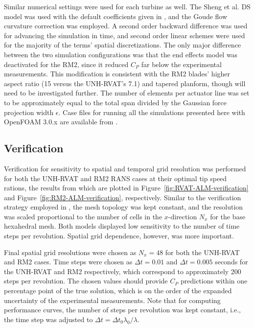 \documentclass[times]{weauth}
\begin{document}
Similar numerical settings were used for each turbine as well. The Sheng et al.
DS model was used with the default coefficients given in \cite{Sheng2008}, and
the Goude flow curvature correction was employed. A second order backward
difference was used for advancing the simulation in time, and second order
linear schemes were used for the majority of the terms' spatial discretizations.
The only major difference between the two simulation configurations was that the
end effects model was deactivated for the RM2, since it reduced $C_P$ far below
the experimental measurements. This modification is consistent with the RM2
blades' higher aspect ratio (15 versus the UNH-RVAT's 7.1) and tapered planform,
though will need to be investigated further. The number of elements per actuator
line was set to be approximately equal to the total span divided by the Gaussian
force projection width $\epsilon$. Case files for running all the simulations
presented here with OpenFOAM 3.0.x are available from
\cite{Bachant2016-UNH-RVAT-turbinesFoam-v1.0.0,
Bachant2016-RM2-turbinesFoam-v1.0.0,
Bachant2016-UNH-RVAT-turbinesFoam-v1.0.0-LES}.



\subsection{Verification}

Verification for sensitivity to spatial and temporal grid resolution was
performed for both the UNH-RVAT and RM2 RANS cases at their optimal tip speed
rations, the results from which are plotted in
Figure~\ref{fig:RVAT-ALM-verification} and
Figure~\ref{fig:RM2-ALM-verification}, respectively. Similar to the verification
strategy employed in \cite{Bachant2016-BR-CFD}, the mesh topology was kept
constant, and the resolution was scaled proportional to the number of cells in
the $x$-direction $N_x$ for the base hexahedral mesh. Both models displayed low
sensitivity to the number of time steps per revolution. Spatial grid dependence,
however, was more important.

Final spatial grid resolutions were chosen as $N_x=48$ for both the UNH-RVAT and
RM2 cases. Time steps were chosen as $\Delta t = 0.01$ and $\Delta t = 0.005$
seconds for the UNH-RVAT and RM2 respectively, which correspond to approximately
200 steps per revolution. The chosen values should provide $C_P$ predictions
within one percentage point of the true solution, which is on the order of the
expanded uncertainty of the experimental measurements. Note that for computing
performance curves, the number of steps per revolution was kept constant, i.e.,
the time step was adjusted to $\Delta t = \Delta t_0 \lambda_0 / \lambda$.
\end{document}
